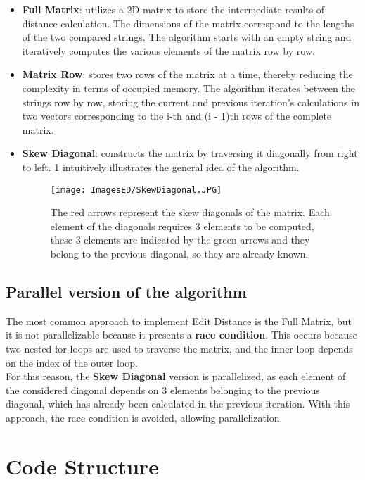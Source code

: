 \documentclass[10pt,twocolumn,letterpaper]{article}
\newcommand{\bit} {\begin{itemize} }
\newcommand{\eit} {\end{itemize} }
\begin{document}
\bit
    \item{\textbf{Full Matrix}: utilizes a 2D matrix to store the intermediate results of distance calculation. The dimensions of the matrix correspond to the lengths of the two compared strings. The algorithm starts with an empty string and iteratively computes the various elements of the matrix row by row.}

    \item{\textbf{Matrix Row}: stores two rows of the matrix at a time, thereby reducing the complexity in terms of occupied memory. The algorithm iterates between the strings row by row, storing the current and previous iteration's calculations in two vectors corresponding to the i-th and (i - 1)th rows of the complete matrix.}

    \item{\textbf{Skew Diagonal}: constructs the matrix by traversing it diagonally from right to left. \cref{fig:sd} intuitively illustrates the general idea of the algorithm.}
    
    \begin{figure}[h]
        \centering
        \texttt{[image: ImagesED/SkewDiagonal.JPG]}
        \caption{The red arrows represent the skew diagonals of the matrix. Each element of the diagonals requires 3 elements to be computed, these 3 elements are indicated by the green arrows and they belong to the previous diagonal, so they are already known.}
        \label{fig:sd}
    \end{figure}
    
\eit

\subsection{Parallel version of the algorithm}

The most common approach to implement Edit Distance is the Full Matrix, but it is not parallelizable because it presents a \textbf{race condition}. This occurs because two nested for loops are used to traverse the matrix, and the inner loop depends on the index of the outer loop.\\
For this reason, the \textbf{Skew Diagonal} version is parallelized, as each element of the considered diagonal depends on 3 elements belonging to the previous diagonal, which has already been calculated in the previous iteration. With this approach, the race condition is avoided, allowing parallelization.

\section{Code Structure}
\end{document}
